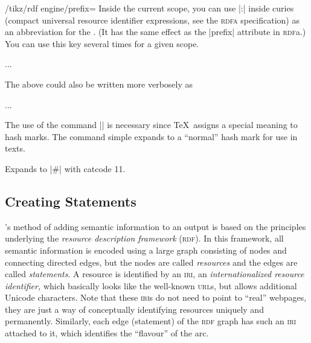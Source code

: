 \begin{key}{/tikz/rdf engine/prefix=}
    Inside the current scope, you can use |:| inside curies
    (compact universal resource identifier expressions, see the \textsc{rdfa}
    specification) as an abbreviation for the . (It has the same
    effect as the |prefix| attribute in \textsc{rdf}a.) You can use this key
    several times for a given scope.
\begin{codeexample}
\scoped [rdf engine = {
  prefix = {rdf: http://www.w3.org/1999/02/22-rdf-syntax-ns\tikzrdfhashmark},
  prefix = {automata: http://www.tcs.uni-luebeck.de/ontologies/2016/04/28/automata/},
  statement = { ..., predicate = rdf:type, object = automata:state },
  statement = { ..., predicate = rdf:type, object = automata:final },
  }] ...
\end{codeexample}
    The above could also be written more verbosely as
\begin{codeexample}
\scoped [rdf engine = {
  statement = { ...,
    predicate = http://www.w3.org/1999/02/22-rdf-syntax-ns\tikzrdfhashmark type,
    object = http://www.tcs.uni-luebeck.de/ontologies/2016/04/28/automata/state }
  },
  statement = { ...,
    predicate = http://www.w3.org/1999/02/22-rdf-syntax-ns\tikzrdfhashmark type,
    object = http://www.tcs.uni-luebeck.de/ontologies/2016/04/28/automata/final }
  }] ...
\end{codeexample}

    The use of the command |\tikzrdfhashmark| is necessary since \TeX\ assigns
    a special meaning to hash marks. The command simple expands to a ``normal''
    hash mark for use in texts.
    \begin{command}{\tikzrdfhashmark}
        Expands to |#| with catcode 11.
    \end{command}
\end{key}


\subsection{Creating Statements}

\tikzname's method of adding semantic information to an output is based on the
principles underlying the \emph{resource description framework} (\textsc{rdf}).
In this framework, all semantic information is encoded using a large graph
consisting of nodes and connecting directed edges, but the nodes are called
\emph{resources} and the edges are called \emph{statements}. A resource is
identified by an \textsc{iri}, an \emph{internationalized resource identifier,}
which basically looks like the well-known \textsc{url}s, but allows additional
Unicode characters. Note that these \textsc{iri}s do not need to point to
``real'' webpages, they are just a way of conceptually identifying resources
uniquely and permanently. Similarly, each edge (statement) of the \textsc{rdf}
graph has such an \textsc{iri} attached to it, which identifies the ``flavour''
of the arc.

